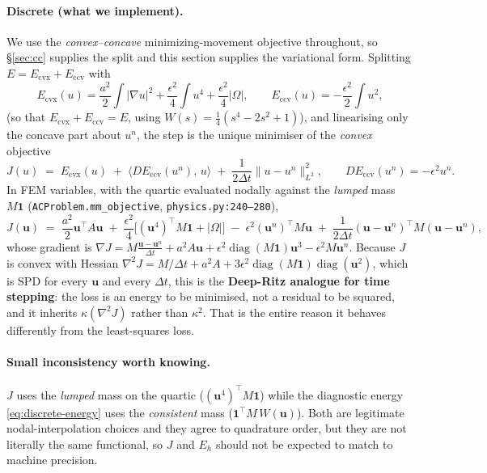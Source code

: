 \documentclass[11pt]{article}
\newcommand{\dt}{\Delta t}
\newcommand{\Ecvx}{E_{\mathrm{cvx}}}
\newcommand{\Eccv}{E_{\mathrm{ccv}}}
\begin{document}
\paragraph{Discrete (what we implement).}
We use the \emph{convex--concave} minimizing-movement objective throughout, so \S\ref{sec:cc}
supplies the split and this section supplies the variational form. Splitting
$E = \Ecvx + \Eccv$ with
\begin{equation}\label{eq:split}
   \Ecvx(u) = \frac{a^2}{2}\!\int|\nabla u|^2 + \frac{\epsilon^2}{4}\!\int u^4
              + \frac{\epsilon^2}{4}|\Omega|,
   \qquad
   \Eccv(u) = -\frac{\epsilon^2}{2}\!\int u^2 ,
\end{equation}
(so that $\Ecvx+\Eccv = E$, using $W(s)=\tfrac14(s^4-2s^2+1)$), and linearising only the concave
part about $u^n$, the step is the unique minimiser of the \emph{convex} objective
\begin{equation}\label{eq:mm-objective}
   J(u) \;=\; \Ecvx(u) \;+\; \big\langle D\Eccv(u^n),\,u\big\rangle
              \;+\; \frac{1}{2\dt}\|u-u^n\|_{L^2}^2,
   \qquad D\Eccv(u^n) = -\epsilon^2 u^n .
\end{equation}
In FEM variables, with the quartic evaluated nodally against the \emph{lumped} mass
$M\mathbf 1$ (\texttt{ACProblem.mm\_objective}, \texttt{physics.py:240--280}),
\begin{equation}\label{eq:mm-discrete}
   J(\mathbf u) \;=\;
     \frac{a^2}{2}\mathbf u^\top A\mathbf u
   \;+\; \frac{\epsilon^2}{4}\Big[(\mathbf u^4)^\top M\mathbf 1 + |\Omega|\Big]
   \;-\; \epsilon^2 (\mathbf u^n)^\top M \mathbf u
   \;+\; \frac{1}{2\dt}(\mathbf u-\mathbf u^n)^\top M(\mathbf u-\mathbf u^n),
\end{equation}
whose gradient is
$\nabla J = M\frac{\mathbf u-\mathbf u^n}{\dt} + a^2A\mathbf u
+ \epsilon^2\operatorname{diag}(M\mathbf 1)\mathbf u^3 - \epsilon^2 M\mathbf u^n$.
Because $J$ is convex with Hessian
$\nabla^2 J = M/\dt + a^2A + 3\epsilon^2\operatorname{diag}(M\mathbf 1)\operatorname{diag}(\mathbf u^2)$,
which is SPD for every $\mathbf u$ and every $\dt$, this is the \textbf{Deep-Ritz analogue for
time stepping}: the loss is an energy to be minimised, not a residual to be squared, and it
inherits $\kappa(\nabla^2 J)$ rather than $\kappa^2$. That is the entire reason it behaves
differently from the least-squares loss.

\paragraph{Small inconsistency worth knowing.}
$J$ uses the \emph{lumped} mass on the quartic ($(\mathbf u^4)^\top M\mathbf 1$) while the
diagnostic energy \eqref{eq:discrete-energy} uses the \emph{consistent} mass
($\mathbf 1^\top M\,W(\mathbf u)$). Both are legitimate nodal-interpolation choices and they agree
to quadrature order, but they are not literally the same functional, so $J$ and $E_h$ should not
be expected to match to machine precision.
\end{document}
